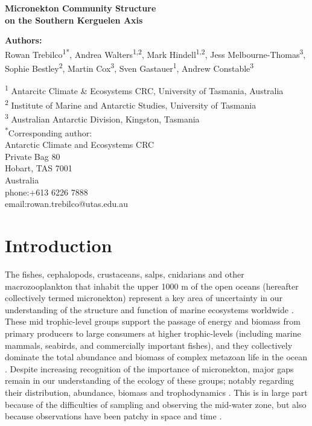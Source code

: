 \documentclass[12pt]{article}
\begin{document}
{\setlength{\parindent}{0cm}
\linenumbers
\doublespacing
\thispagestyle{empty}


\centering \large{\textbf{Micronekton Community Structure \\on the Southern Kerguelen Axis}}

\normalsize
\flushleft

\textbf{Authors:}\\
Rowan Trebilco\textsuperscript{1*},
Andrea Walters\textsuperscript{1,2},
Mark Hindell\textsuperscript{1,2},
Jess Melbourne-Thomas\textsuperscript{3},
Sophie Bestley\textsuperscript{2},
Martin Cox\textsuperscript{3},
Sven Gastauer\textsuperscript{1},
Andrew Constable\textsuperscript{3}


\textsuperscript{1} Antarcitc Climate \& Ecosystems CRC, University of Tasmania, Australia\\
\textsuperscript{2} Institute of Marine and Antarctic Studies, University of Tasmania\\ 
\textsuperscript{3} Australian Antarctic Division, Kingston, Tasmania\\ 

\textsuperscript{*}Corresponding author:\\
Antarctic Climate and Ecosystems CRC\\
Private Bag 80\\
Hobart, TAS 7001\\
Australia\\
phone:+613 6226 7888\\
email:rowan.trebilco@utas.edu.au\\


\clearpage
\section{Introduction}
\linenumbers

The fishes, cephalopods, crustaceans, salps, cnidarians and other macrozooplankton that inhabit the upper 1000 m of the open oceans (hereafter collectively termed micronekton) represent a key area of uncertainty in our understanding of the structure and function of marine ecosystems worldwide \citep{StJohn:2016cr,Young:2015}.
These mid trophic-level groups support the passage of energy and biomass from primary producers to large consumers at higher trophic-levels (including marine mammals, seabirds, and commercially important fishes), and they collectively dominate the total abundance and biomass of complex metazoan life in the ocean \cite{BarOn:2018bj,Irigoien:2014}.
Despite increasing recognition of the importance of micronekton, major gaps remain in our understanding of the ecology of these groups; notably regarding their distribution, abundance, biomass and trophodynamics \cite{Young:2015,Newman:SOOS_CWP,Davison:2015fq}. 
This is in large part because of the difficulties of sampling and observing the mid-water zone, but also because observations have been patchy in space and time \cite{Kaartvedt:2012ji,Newman:SOOS_CWP}.

}
\end{document}
